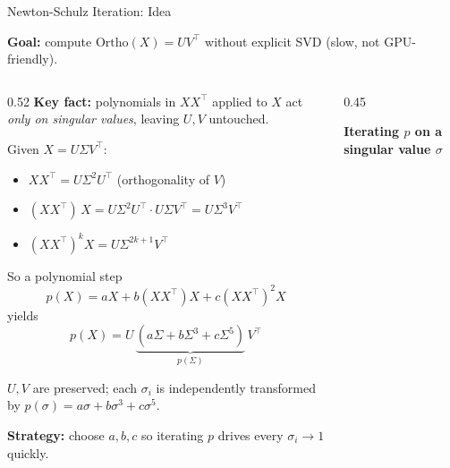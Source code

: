 \begin{frame}{Newton-Schulz Iteration: Idea}

  \textbf{Goal:} compute $\text{Ortho}(X) = U V^\top$ without explicit SVD (slow, not GPU-friendly).

  \vspace{0.3em}
  \begin{columns}[T]
    \begin{column}{0.52\textwidth}
      \textbf{Key fact:} polynomials in $XX^\top$ applied to $X$ act \emph{only on singular values}, leaving $U, V$ untouched.

      \vspace{0.3em}
      Given $X = U \Sigma V^\top$:
      \begin{itemize}
        \item $XX^\top = U \Sigma^2 U^\top$ (orthogonality of $V$)
        \item $(XX^\top)\, X = U \Sigma^2 U^\top \cdot U \Sigma V^\top = U \Sigma^3 V^\top$
        \item $(XX^\top)^k X = U \Sigma^{2k+1} V^\top$
      \end{itemize}

      \vspace{0.3em}
      So a polynomial step
      \[
        p(X) = aX + b(XX^\top)X + c(XX^\top)^2 X
      \]
      yields
      \[
        p(X) = U\, \underbrace{(a\Sigma {+} b\Sigma^3 {+} c\Sigma^5)}_{p(\Sigma)}\, V^\top
      \]

      $U, V$ are preserved; each $\sigma_i$ is independently transformed by $p(\sigma) = a\sigma + b\sigma^3 + c\sigma^5$.

      \vspace{0.3em}
      \textbf{Strategy:} choose $a, b, c$ so iterating $p$ drives every $\sigma_i \to 1$ quickly.
    \end{column}
    \begin{column}{0.45\textwidth}
      \begin{center}
        \textbf{Iterating $p$ on a singular value $\sigma$}
        \vspace{0.2em}

\end{center}
\end{column}
\end{columns}
\end{frame}
